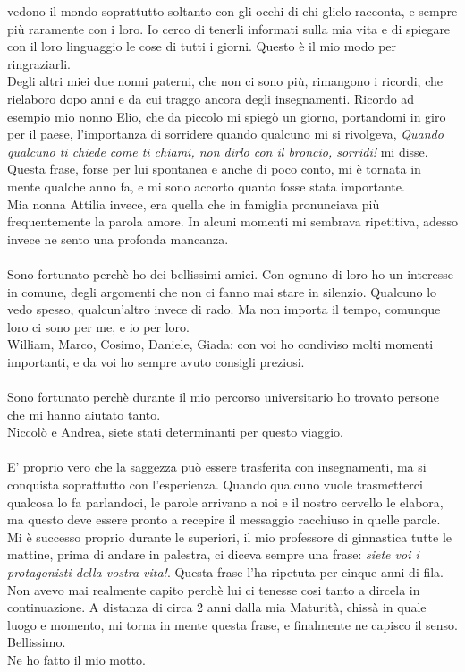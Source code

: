 vedono il mondo soprattutto soltanto con gli occhi di chi glielo racconta, e sempre più raramente con i loro. Io cerco di tenerli informati sulla mia vita e di spiegare
con il loro linguaggio le cose di tutti i giorni. Questo è il mio modo per ringraziarli.
\\Degli altri miei due nonni paterni, che non ci sono più, rimangono i ricordi, che rielaboro dopo anni e da cui traggo ancora degli insegnamenti.
Ricordo ad esempio mio nonno Elio, che da piccolo mi spiegò un giorno, portandomi in giro per il paese, l'importanza di sorridere quando qualcuno mi si rivolgeva,
 \emph{Quando qualcuno ti chiede come ti chiami, non dirlo con il broncio, sorridi!} mi disse.
 Questa frase, forse per lui spontanea e anche di poco conto, mi è tornata in mente qualche anno fa, e mi sono accorto quanto fosse stata importante.
 \\
 Mia nonna Attilia invece, era quella che in famiglia pronunciava più frequentemente la parola amore. In alcuni momenti mi sembrava ripetitiva, 
 adesso invece ne sento una profonda mancanza.
\\\\
Sono fortunato perchè ho dei bellissimi amici. Con ognuno di loro ho un interesse in comune, degli argomenti che non ci fanno mai stare in silenzio.
Qualcuno lo vedo spesso, qualcun'altro invece di rado. Ma non importa il tempo, comunque loro ci sono per me, e io per loro.
\\William, Marco, Cosimo, Daniele, Giada: con voi ho condiviso molti momenti importanti, e da voi ho sempre avuto consigli preziosi.
\\\\
Sono fortunato perchè durante il mio percorso universitario ho trovato persone che mi hanno aiutato tanto.
\\Niccolò e Andrea, siete stati determinanti per questo viaggio.
\\\\
 E' proprio vero che la saggezza può essere trasferita con insegnamenti, ma si conquista soprattutto con l'esperienza.
 Quando qualcuno vuole trasmetterci qualcosa lo fa parlandoci, 
 le parole arrivano a noi e il nostro cervello le elabora, ma questo deve essere pronto a recepire il messaggio racchiuso in quelle parole.
 Mi è successo proprio durante le superiori, il mio professore di ginnastica tutte le mattine, prima di andare in palestra, ci diceva sempre una frase: 
 \emph{siete voi i protagonisti della vostra vita!}. Questa frase l'ha ripetuta per cinque anni di fila. 
 Non avevo mai realmente capito perchè lui ci tenesse cosi tanto a dircela in continuazione.
 A distanza di circa 2 anni dalla mia Maturità, chissà in quale luogo e momento, mi torna in mente questa frase, e finalmente ne capisco il senso. Bellissimo.
 \\Ne ho fatto il mio motto.
